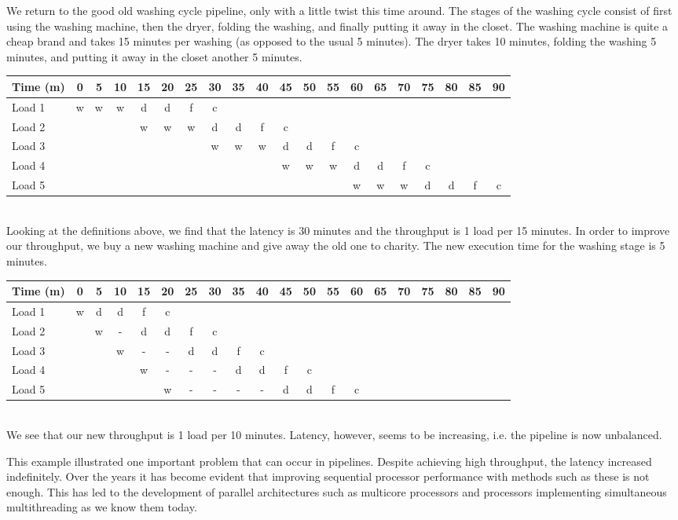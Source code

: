 \documentclass[main.tex]{subfiles}
\begin{document}
\begin{example}
    We return to the good old washing cycle pipeline, only with a little twist this time around. The stages of the washing cycle consist of first using the washing machine, then the dryer, folding the washing, and finally putting it away in the closet. The washing machine is quite a cheap brand and takes 15 minutes per washing (as opposed to the usual 5 minutes). The dryer takes 10 minutes, folding the washing 5 minutes, and putting it away in the closet another 5 minutes.\\[3mm]
    \begin{tabular}{l | *{19}{c}}
        Time (m) & 0 & 5 & 10 & 15 & 20 & 25 & 30 & 35 & 40 & 45 & 50 & 55 & 60 & 65 & 70 & 75 & 80 & 85 & 90 \\
        \hline
        Load 1 & w & w & w & d & d & f & c\\
        Load 2 &   &   &   & w & w & w & d & d & f & c\\
        Load 3 &   &   &   &   &   &   & w & w & w & d & d & f & c \\
        Load 4 &   &   &   &   &   &   &   &   &   & w & w & w & d & d & f & c \\
        Load 5 &   &   &   &   &   &   &   &   &   &   &   &   & w & w & w & d & d & f & c
    \end{tabular} \\[3mm]
    Looking at the definitions above, we find that the latency is 30 minutes and the throughput is 1 load per 15 minutes. In order to improve our throughput, we buy a new washing machine and give away the old one to charity. The new execution time for the washing stage is 5 minutes. \\[3mm]
    \begin{tabular}{l | *{19}{c}}
        Time (m) & 0 & 5 & 10 & 15 & 20 & 25 & 30 & 35 & 40 & 45 & 50 & 55 & 60 & 65 & 70 & 75 & 80 & 85 & 90 \\
        \hline
        Load 1 & w & d & d & f & c\\
        Load 2 &   & w & - & d & d & f & c\\
        Load 3 &   &   & w & - & - & d & d & f & c \\
        Load 4 &   &   &   & w & - & - & - & d & d & f & c \\
        Load 5 &   &   &   &   & w & - & - & - & - & d & d & f & c
    \end{tabular} \\[3mm]
    We see that our new throughput is 1 load per 10 minutes. Latency, however, seems to be increasing, i.e. the pipeline is now unbalanced. 
\end{example}
\noindent This example illustrated one important problem that can occur in pipelines. Despite achieving high throughput, the latency increased indefinitely.
Over the years it has become evident that improving sequential processor performance with methods such as these is not enough. This has led to the development of parallel architectures such as multicore processors and processors implementing simultaneous multithreading as we know them today.
\end{document}
